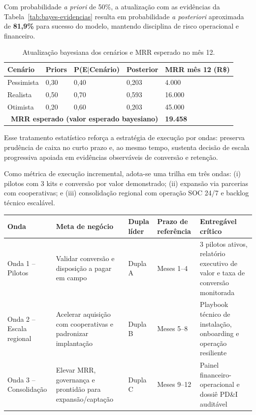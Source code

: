 Com probabilidade \textit{a priori} de 50\%, a atualização com as evidências da Tabela~\ref{tab:bayes-evidencias} resulta em probabilidade \textit{a posteriori} aproximada de \textbf{81,9\%} para sucesso do modelo, mantendo disciplina de risco operacional e financeiro.

\begin{table}[htb]
\centering
\caption{Atualização bayesiana dos cenários e MRR esperado no mês 12.}
\label{tab:bayes-cenarios-mrr}
\begin{tabular}{|p{}|p{}|p{}|p{}|p{}|}
\hline
\textbf{Cenário} & \textbf{Priors} & \textbf{P(E$\mid$Cenário)} & \textbf{Posterior} & \textbf{MRR mês 12 (R\$)} \\
\hline
Pessimista & 0,30 & 0,40 & 0,203 & 4.000 \\
\hline
Realista & 0,50 & 0,70 & 0,593 & 16.000 \\
\hline
Otimista & 0,20 & 0,60 & 0,203 & 45.000 \\
\hline
\multicolumn{4}{|r|}{\textbf{MRR esperado (valor esperado bayesiano)}} & \textbf{19.458} \\
\hline
\end{tabular}
\end{table}

Esse tratamento estatístico reforça a estratégia de execução por ondas: preserva prudência de caixa no curto prazo e, ao mesmo tempo, sustenta decisão de escala progressiva apoiada em evidências observáveis de conversão e retenção.

Como métrica de execução incremental, adota-se uma trilha em três ondas: (i) pilotos com 3 kits e conversão por valor demonstrado; (ii) expansão via parcerias com cooperativas; e (iii) consolidação regional com operação SOC 24/7 e backlog técnico escalável.

\begin{quadro}[htb]
\centering
\caption{Plano de execução por ondas com protagonismo das duplas.}
\label{qua:ondas-execucao-duplas}
\begin{tabular}{|p{}|p{}|p{}|p{}|p{}|}
\hline
\textbf{Onda} & \textbf{Meta de negócio} & \textbf{Dupla líder} & \textbf{Prazo de referência} & \textbf{Entregável crítico} \\
\hline
Onda 1 -- Pilotos & Validar conversão e disposição a pagar em campo & Dupla A & Meses 1--4 & 3 pilotos ativos, relatório executivo de valor e taxa de conversão monitorada \\
\hline
Onda 2 -- Escala regional & Acelerar aquisição com cooperativas e padronizar implantação & Dupla B & Meses 5--8 & Playbook técnico de instalação, onboarding e operação resiliente \\
\hline
Onda 3 -- Consolidação & Elevar MRR, governança e prontidão para expansão/captação & Dupla C & Meses 9--12 & Painel financeiro-operacional e dossiê PD\&I auditável \\
\hline
\end{tabular}
\end{quadro}

